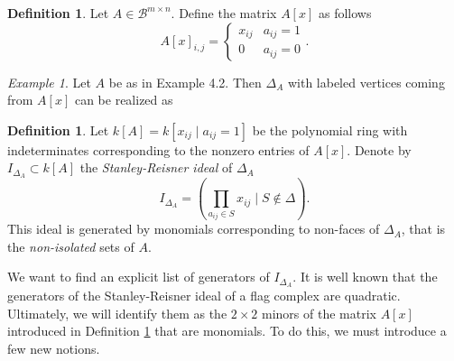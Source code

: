 \documentclass[11pt,letterpaper, reqno]{amsart}
\theoremstyle{definition}
\newtheorem{definition}[theorem]{Definition}
\theoremstyle{remark}
\newtheorem{example}[theorem]{Example}
\newcommand{\Bc}{\mathcal{B}}
\numberwithin{equation}{section}
\begin{document}
\begin{definition}\label{def: A}
Let $A\in\Bc^{m\times n}$. Define the matrix $A[x]$ as follows 
\[
A[x]_{i,j}=\begin{cases} x_{ij}& a_{ij}=1\\ 0 & a_{ij}=0 \end{cases}.
\]
\end{definition} 
\begin{example}
Let $A$ be as in Example 4.2. Then $\Delta_A$ with labeled vertices coming from $A[x]$ can be realized as 
\begin{center}

\end{center}
\end{example}


\begin{definition}
Let $k[A]= k[x_{ij} \mid a_{ij}=1]$ be the polynomial ring with indeterminates corresponding to the nonzero entries of $A[x]$. Denote by $I_{\Delta_A}\subset k[A]$  the {\em Stanley-Reisner ideal} of $\Delta_A$
\begin{equation}\label{eq: SR ideal}
I_{\Delta_A}=\left( \prod_{a_{ij}\in S} x_{ij} \mid S \not \in \Delta\right).
\end{equation}
This ideal is generated by monomials corresponding to non-faces of $\Delta_A$, that is the \textit{non-isolated} sets of $A$.
\end{definition}

We want to find an explicit list of generators of $I_{\Delta_A}$. It is well known that the generators of the Stanley-Reisner ideal of a flag complex are quadratic. Ultimately, we will identify them as the $2\times 2$ minors of the matrix $A[x]$ introduced in Definition \ref{def: A} that are monomials. To do this, we must introduce a few new notions.
\end{document}
